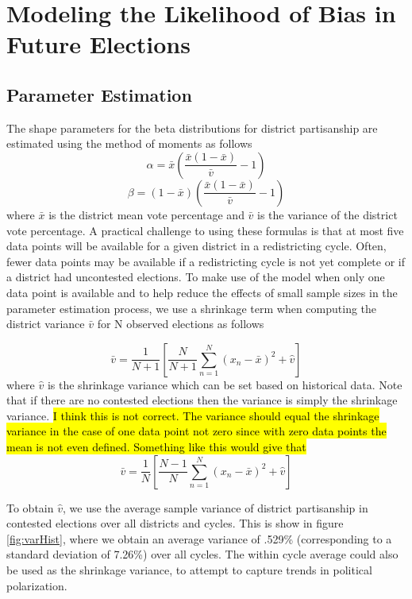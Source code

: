 \documentclass[preprint,12pt]{article}
\newcommand{\CM}[2][green]{ {\sethlcolor{#1} \hl{#2}} }
\begin{document}
\section{Modeling the Likelihood of Bias in Future Elections\label{sec:FB}}

\subsection{Parameter Estimation}
The shape parameters for the beta distributions for district partisanship are estimated using the method of moments as follows
\begin{equation}
    \alpha = \bar{x} \left(\frac{\bar{x}\left(1-\bar{x}\right)}{\bar{v}}-1\right)
\end{equation}
\begin{equation}
    \beta = \left(1-\bar{x}\right) \left(\frac{\bar{x}\left(1-\bar{x}\right)}{\bar{v}}-1\right)
\end{equation}
where $\bar{x}$ is the district mean vote percentage and $\bar{v}$ is the variance of the district vote percentage.
A practical challenge to using these formulas is that at most five data points will be available for a given district in a redistricting cycle.
Often, fewer data points may be available if a redistricting cycle is not yet complete or if a district had uncontested elections.
To make use of the model when only one data point is available and to help reduce the effects of small sample sizes in the parameter estimation process, we use a shrinkage term when computing the district variance $\bar{v}$ for N observed elections as follows

\begin{equation}
    \bar{v} = \frac{1}{N+1}\left[\frac{N}{N+1}\sum_{n=1}^{N}\left(x_{n}-\bar{x}\right)^{2}+\hat{v}\right]
\end{equation}
where $\hat{v}$ is the shrinkage variance which can be set based on historical data.
Note that if there are no contested elections then the variance is simply the shrinkage variance.
\CM{I think this is not correct. The variance should equal the shrinkage variance in the case of one data point not zero since with zero data points the mean is not even defined. Something like this would give that}
\begin{equation}
    \bar{v} = \frac{1}{N}\left[\frac{N-1}{N}\sum_{n=1}^{N}\left(x_{n}-\bar{x}\right)^{2}+\hat{v}\right]
\end{equation}

To obtain $\hat{v}$, we use the average sample variance of district partisanship in contested elections over all districts and cycles.
This is show in figure \ref{fig:varHist}, where we obtain an average variance of .529\% (corresponding to a standard deviation of 7.26\%) over all cycles.
The within cycle average could also be used as the shrinkage variance, to attempt to capture trends in political polarization.
\end{document}
